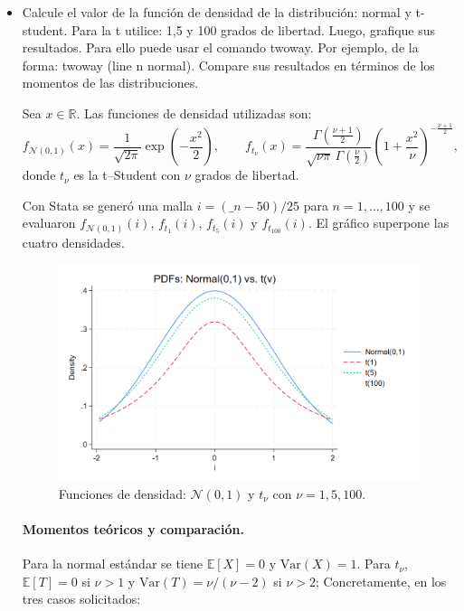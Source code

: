 \documentclass[12pt]{article}
\begin{document}
\begin{itemize}

    \item Calcule el valor de la función de densidad de la distribución: normal y t-student. Para la t utilice: 1,5 y 100 grados de libertad. Luego, grafique sus resultados. Para ello puede usar el comando twoway. Por ejemplo, de la forma: twoway (line n normal). Compare sus resultados en términos de los momentos de las distribuciones.

    Sea \(x \in \mathbb{R}\). Las funciones de densidad utilizadas son:
    \[
    f_{\mathcal N(0,1)}(x)=\frac{1}{\sqrt{2\pi}}\exp\!\left(-\frac{x^{2}}{2}\right),\qquad
    f_{t_\nu}(x)=\frac{\Gamma\!\left(\frac{\nu+1}{2}\right)}{\sqrt{\nu\pi}\,\Gamma\!\left(\frac{\nu}{2}\right)}
    \left(1+\frac{x^{2}}{\nu}\right)^{-\frac{\nu+1}{2}},
    \]
    donde \(t_\nu\) es la t--Student con \(\nu\) grados de libertad.
    
    Con Stata se generó una malla \(i = (\_n-50)/25\) para \(n=1,\dots,100\) y se evaluaron \(f_{\mathcal N(0,1)}(i)\), \(f_{t_1}(i)\), \(f_{t_5}(i)\) y \(f_{t_{100}}(i)\). El gráfico superpone las cuatro densidades.
    
    \begin{figure}[h!]
    \centering
    \includegraphics[width=.8\textwidth]{Figures/0111-pdfs.png}%
    \caption{Funciones de densidad: \(\mathcal N(0,1)\) y \(t_\nu\) con \(\nu=1,5,100\).}
    \label{fig:pdfs_normal_t}
    \end{figure}
    
    \paragraph{Momentos teóricos y comparación.}
    Para la normal estándar se tiene \(\mathbb{E}[X]=0\) y \(\mathrm{Var}(X)=1\).
    Para \(t_\nu\), \(\mathbb{E}[T]=0\) si \(\nu>1\) y \(\mathrm{Var}(T)=\nu/(\nu-2)\) si \(\nu>2\);
    Concretamente, en los tres casos solicitados:
    

\end{itemize}
\end{document}
